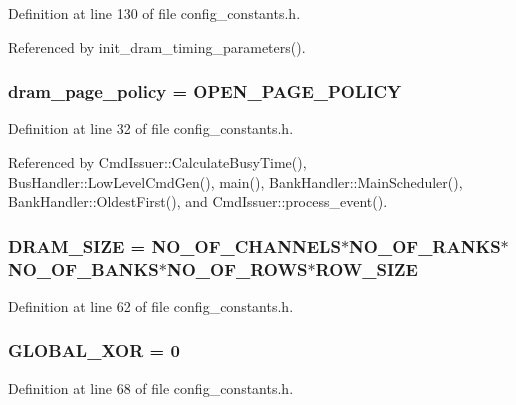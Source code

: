 Definition at line 130 of file config\_\-constants.h.

Referenced by init\_\-dram\_\-timing\_\-parameters().
\subsubsection[{dram\_\-page\_\-policy}]{ {\bf dram\_\-page\_\-policy} = OPEN\_\-PAGE\_\-POLICY}\label{config__constants_8h_9b7e9850a84a1625ba61689a4c8b7686}




Definition at line 32 of file config\_\-constants.h.

Referenced by CmdIssuer::CalculateBusyTime(), BusHandler::LowLevelCmdGen(), main(), BankHandler::MainScheduler(), BankHandler::OldestFirst(), and CmdIssuer::process\_\-event().
\subsubsection[{DRAM\_\-SIZE}]{ {\bf DRAM\_\-SIZE} = {\bf NO\_\-OF\_\-CHANNELS}$\ast${\bf NO\_\-OF\_\-RANKS}$\ast${\bf NO\_\-OF\_\-BANKS}$\ast${\bf NO\_\-OF\_\-ROWS}$\ast${\bf ROW\_\-SIZE}}\label{config__constants_8h_c7b5bdc4efe710284e25b5a1b12d3312}




Definition at line 62 of file config\_\-constants.h.
\subsubsection[{GLOBAL\_\-XOR}]{ {\bf GLOBAL\_\-XOR} = 0}\label{config__constants_8h_0c871220ef7613fb31b7644c90e63671}




Definition at line 68 of file config\_\-constants.h.
